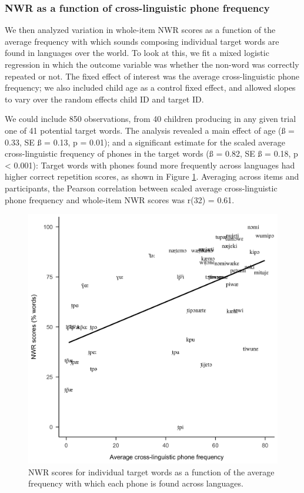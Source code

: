 \documentclass[english,,man,floatsintext]{apa6}
\begin{document}
\hypertarget{nwr-as-a-function-of-cross-linguistic-phone-frequency}{%
\subsubsection{NWR as a function of cross-linguistic phone frequency}\label{nwr-as-a-function-of-cross-linguistic-phone-frequency}}

We then analyzed variation in whole-item NWR scores as a function of the average frequency with which sounds composing individual target words are found in languages over the world. To look at this, we fit a mixed logistic regression in which the outcome variable was whether the non-word was correctly repeated or not. The fixed effect of interest was the average cross-linguistic phone frequency; we also included child age as a control fixed effect, and allowed slopes to vary over the random effects child ID and target ID.

We could include 850 observations, from 40 children producing in any given trial one of 41 potential target words. The analysis revealed a main effect of age (ß = 0.33, SE ß = 0.13, p = 0.01); and a significant estimate for the scaled average cross-linguistic frequency of phones in the target words (ß = 0.82, SE ß = 0.18, p \textless{} 0.001): Target words with phones found more frequently across languages had higher correct repetition scores, as shown in Figure \ref{fig:fig-xling-freq}. Averaging across items and participants, the Pearson correlation between scaled average cross-linguistic phone frequency and whole-item NWR scores was r(32) = 0.61.

\begin{figure}[!t]

{\centering \includegraphics[width=0.65\linewidth]{nwr.by.freq.ITEM} 

}

\caption{NWR scores for individual target words as a function of the average frequency with which each phone is found across languages.}\label{fig:fig-xling-freq}
\end{figure}
\end{document}
